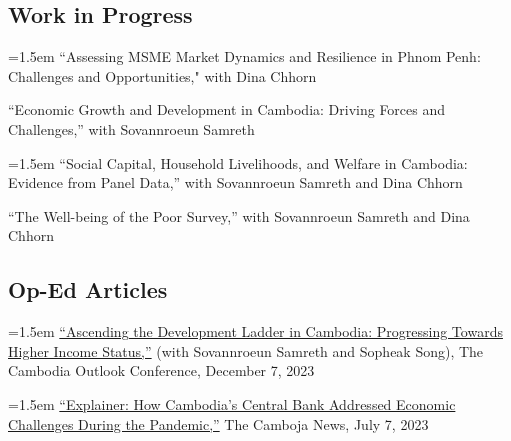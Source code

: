 \documentclass[10pt,a4paper]{article}
\begin{document}
\subsection*{Work in Progress}
	\hangindent=1.5em
	``Assessing MSME Market Dynamics and Resilience in Phnom Penh: Challenges and Opportunities," with Dina Chhorn\\ \vspace{-.5em}
	
	``Economic Growth and Development in Cambodia: Driving Forces and Challenges,'' with Sovannroeun Samreth\\ \vspace{-.5em}
	
	\hangindent=1.5em
	``Social Capital, Household Livelihoods, and Welfare in Cambodia: Evidence from Panel Data,'' with Sovannroeun Samreth and Dina Chhorn\\ \vspace{-.5em}
	
	``The Well-being of the Poor Survey,'' with Sovannroeun Samreth and Dina Chhorn

\subsection*{Op-Ed Articles}

	\hangindent=1.5em
	\href{https://coc2023.cdri.org.kh/ascending-the-development-ladder-in-cambodia-progressing-towards-higher-income-status/}{``Ascending the Development Ladder in Cambodia: Progressing Towards Higher Income Status,''} (with Sovannroeun Samreth and Sopheak Song), The Cambodia Outlook Conference, December 7, 2023\\ \vspace{-.5em}
	
	\hangindent=1.5em
	\href{https://cambojanews.com/explainer-how-cambodias-central-bank-addressed-economic-challenges-during-the-pandemic/}{``Explainer: How Cambodia's Central Bank Addressed Economic Challenges During the Pandemic,''} The Camboja News, July 7, 2023\\ \vspace{-.5em}
	
\end{document}
